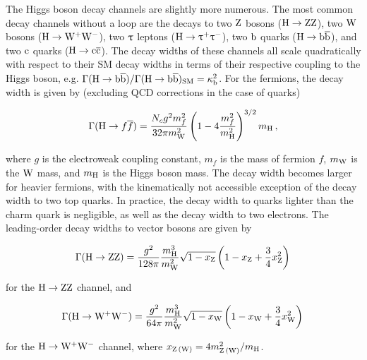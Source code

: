 The Higgs boson decay channels are slightly more numerous.
% 
The most common decay channels without a loop are the decays to two $\mathrm{Z}$ bosons ($\mathrm{H}\to\mathrm{Z}\mathrm{Z}$), two $\mathrm{W}$ bosons ($\mathrm{H}\to\mathrm{W}^+\mathrm{W}^-$), two $\uptau$ leptons ($\mathrm{H}\to\uptau^+\uptau^-$), two $\mathrm{b}$ quarks ($\mathrm{H}\to\mathrm{b}\overline{\mathrm{b}}$), and two $\mathrm{c}$ quarks ($\mathrm{H}\to\mathrm{c}\overline{\mathrm{c}}$).
% 
The decay widths of these channels all scale quadratically with respect to their SM decay widths in terms of their respective coupling to the Higgs boson, e.g. $\Gamma(\mathrm{H}\to\mathrm{b}\overline{\mathrm{b}}) / \Gamma(\mathrm{H}\to\mathrm{b}\overline{\mathrm{b}})_\text{SM} = \kappa_{\mathrm{b}}^2$.
% 
For the fermions, the decay width is given by (excluding QCD corrections in the case of quarks)~\cite{higgshunter}
% 
\begin{linenomath*}
\begin{equation}
\label{eq:brhff}
\Gamma(\mathrm{H} \to f\overline{f})
=
\frac{N_c g^2 m_f^2}{32\pi m_\mathrm{W}^2}
\left( 1-4\frac{m_f^2}{m_{\mathrm{H}}^2} \right)^{ 3/2 }
m_{\mathrm{H}} 
\,,
\end{equation}
\end{linenomath*}
% 
where $g$ is the electroweak coupling constant, $m_f$ is the mass of fermion $f$, $m_\mathrm{W}$ is the $\mathrm{W}$ mass, and $m_{\mathrm{H}}$ is the Higgs boson mass.
% 
The decay width becomes larger for heavier fermions, with the kinematically not accessible exception of the decay width to two top quarks.
% 
% 
In practice, the decay width to quarks lighter than the charm quark is negligible, as well as the decay width to two electrons.
% 
The leading-order decay widths to vector bosons are given by~\cite{higgshunter}
% 
\begin{linenomath*}
\begin{equation}
\Gamma(\mathrm{H}\to\mathrm{Z}\mathrm{Z})
=
\frac{g^2}{128\pi} \frac{m_{\mathrm{H}}^3}{m_\mathrm{W}^2}
\sqrt{1-x_\mathrm{Z}}
\left( 1 - x_\mathrm{Z} + \frac{3}{4} x_\mathrm{Z}^2 \right)
\,
\end{equation}
\end{linenomath*}
% 
for the $\mathrm{H}\to\mathrm{Z}\mathrm{Z}$ channel, and
% 
\begin{linenomath*}
\begin{equation}
\Gamma(\mathrm{H}\to\mathrm{W}^+\mathrm{W}^-)
=
\frac{g^2}{64\pi} \frac{m_{\mathrm{H}}^3}{m_\mathrm{W}^2}
\sqrt{1-x_\mathrm{W}}
\left( 1 - x_\mathrm{W} + \frac{3}{4} x_\mathrm{W}^2 \right)
\,
\end{equation}
\end{linenomath*}
% 
for the $\mathrm{H}\to\mathrm{W}^+\mathrm{W}^-$ channel, where $x_{\mathrm{Z} \, (\mathrm{W})} = 4 m_{\mathrm{Z}\,(\mathrm{W})}^2 / m_{\mathrm{H}}$.


